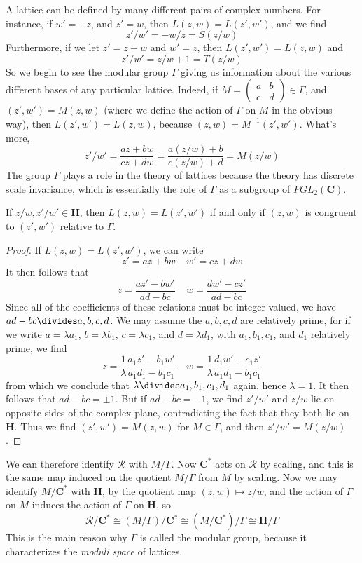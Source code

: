 A lattice can be defined by many different pairs of complex numbers. For instance, if $w' = -z$, and $z' = w$, then $L(z,w) = L(z',w')$, and we find
%
\[ z'/w' = -w/z = S(z/w) \]
%
Furthermore, if we let $z' = z + w$ and $w' = z$, then $L(z',w') = L(z,w)$ and
%
\[ z'/w' = z/w + 1 = T(z/w) \]
%
So we begin to see the modular group $\Gamma$ giving us information about the various different bases of any particular lattice. Indeed, if $M = \left( \begin{smallmatrix} a & b \\ c & d \end{smallmatrix} \right) \in \Gamma$, and $(z',w') = M(z,w)$ (where we define the action of $\Gamma$ on $M$ in the obvious way), then $L(z', w') = L(z, w)$, because $(z,w) = M^{-1}(z',w')$. What's more,
%
\[ z'/w' = \frac{az + bw}{cz + dw} = \frac{a(z/w) + b}{c(z/w) + d} = M(z/w) \]
%
The group $\Gamma$ plays a role in the theory of lattices because the theory has discrete scale invariance, which is essentially the role of $\Gamma$ as a subgroup of $PGL_2(\mathbf{C})$.

\begin{theorem}
    If $z/w, z'/w' \in \mathbf{H}$, then $L(z,w) = L(z',w')$ if and only if $(z,w)$ is congruent to $(z',w')$ relative to $\Gamma$.
\end{theorem}
\begin{proof}
    If $L(z,w) = L(z',w')$, we can write
    \[ z' = az + bw\ \ \ \ \ w' = cz + dw \]
    It then follows that
    \[ z = \frac{az' - bw'}{ad - bc}\ \ \ \ \ w = \frac{dw' - cz'}{ad-bc} \]
    Since all of the coefficients of these relations must be integer valued, we have $ad - bc \divides a,b,c,d$. We may assume the $a,b,c,d$ are relatively prime, for if we write $a = \lambda a_1$, $b = \lambda b_1$, $c = \lambda c_1$, and $d = \lambda d_1$, with $a_1, b_1, c_1$, and $d_1$ relatively prime, we find
    \[ z = \frac{1}{\lambda} \frac{a_1 z' - b_1 w'}{a_1 d_1 - b_1 c_1} \ \ \ \ \ w =  \frac{1}{\lambda} \frac{d_1 w' - c_1 z'}{a_1 d_1 - b_1 c_1} \]
    from which we conclude that $\lambda \divides a_1, b_1, c_1, d_1$ again, hence $\lambda = 1$. It then follows that $ad - bc = \pm 1$. But if $ad - bc = -1$, we find $z'/w'$ and $z/w$ lie on opposite sides of the complex plane, contradicting the fact that they both lie on $\mathbf{H}$. Thus we find $(z',w') = M(z,w)$ for $M \in \Gamma$, and then $z'/w' = M(z/w)$.
\end{proof}

We can therefore identify $\mathcal{R}$ with $M/\Gamma$. Now $\mathbf{C}^*$ acts on $\mathcal{R}$ by scaling, and this is the same map induced on the quotient $M/\Gamma$ from $M$ by scaling. Now we may identify $M/\mathbf{C}^*$ with $\mathbf{H}$, by the quotient map $(z,w) \mapsto z/w$, and the action of $\Gamma$ on $M$ induces the action of $\Gamma$ on $\mathbf{H}$, so
%
\[ \mathcal{R}/\mathbf{C}^* \cong (M/\Gamma)/\mathbf{C}^* \cong (M/\mathbf{C}^*)/\Gamma \cong \mathbf{H}/\Gamma \]
%
This is the main reason why $\Gamma$ is called the modular group, because it characterizes the {\it moduli space} of lattices.

